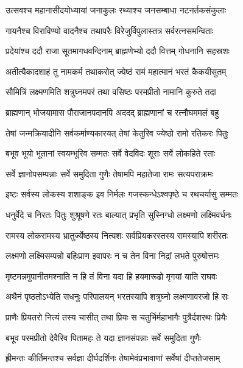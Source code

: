 \twolineshloka
{उत्सवश्च महानासीदयोध्यायां जनाकुलः}
{रथ्याश्च जनसम्बाधा नटनर्तकसंकुलाः} %

\twolineshloka
{गायनैश्च विराविण्यो वादनैश्च तथापरैः}
{विरेजुर्विपुलास्तत्र सर्वरत्नसमन्विताः} %

\twolineshloka
{प्रदेयांश्च ददौ राजा सूतमागधवन्दिनाम्}
{ब्राह्मणेभ्यो ददौ वित्तम् गोधनानि सहस्रशः} %

\twolineshloka
{अतीत्यैकादशाहं तु नामकर्म तथाकरोत्}
{ज्येष्ठं रामं महात्मानं भरतं कैकयीसुतम्} %

\twolineshloka
{सौमित्रिं लक्ष्मणमिति शत्रुघ्नमपरं तथा}
{वसिष्ठः परमप्रीतो नामानि कुरुते तदा} %

\twolineshloka
{ब्राह्मणान् भोजयामास पौराजानपदानपि}
{अददद् ब्राह्मणानां च रत्नौघममलं बहु} %

\twolineshloka
{तेषां जन्मक्रियादीनि सर्वकर्माण्यकारयत्}
{तेषां केतुरिव ज्येष्ठो रामो रतिकरः पितुः} %

\twolineshloka
{बभूव भूयो भूतानां स्वयम्भूरिव सम्मतः}
{सर्वे वेदविदः शूराः सर्वे लोकहिते रताः} %

\twolineshloka
{सर्वे ज्ञानोपसम्पन्नाः सर्वे समुदिता गुणैः}
{तेषामपि महातेजा रामः सत्यपराक्रमः} %

\twolineshloka
{इष्टः सर्वस्य लोकस्य शशाङ्क इव निर्मलः}
{गजस्कन्धेऽश्वपृष्ठे च रथचर्यासु सम्मतः} %

\twolineshloka
{धनुर्वेदे च निरतः पितुः शुश्रूषणे रतः}
{बाल्यात् प्रभृति सुस्निग्धो लक्ष्मणो लक्ष्मिवर्धनः} %

\twolineshloka
{रामस्य लोकरामस्य भ्रातुर्ज्येष्ठस्य नित्यशः}
{सर्वप्रियकरस्तस्य रामस्यापि शरीरतः} %

\twolineshloka
{लक्ष्मणो लक्ष्मिसम्पन्नो बहिःप्राण इवापरः}
{न च तेन विना निद्रां लभते पुरुषोत्तमः} %

\twolineshloka
{मृष्टमन्नमुपानीतमश्नाति न हि तं विना}
{यदा हि हयमारूढो मृगयां याति राघवः} %

\twolineshloka
{अथैनं पृष्ठतोऽभ्येति सधनुः परिपालयन्}
{भरतस्यापि शत्रुघ्नो लक्ष्मणावरजो हि सः} %

\twolineshloka
{प्राणैः प्रियतरो नित्यं तस्य चासीत् तथा प्रियः}
{स चतुर्भिर्महाभागैः पुत्रैर्दशरथः प्रियैः} %

\twolineshloka
{बभूव परमप्रीतो देवैरिव पितामहः}
{ते यदा ज्ञानसंपन्नाः सर्वे समुदिता गुणैः} %

\twolineshloka
{ह्रीमन्तः कीर्तिमन्तश्च सर्वज्ञा दीर्घदर्शिनः}
{तेषामेवंप्रभावाणां सर्वेषां दीप्ततेजसाम्} %

